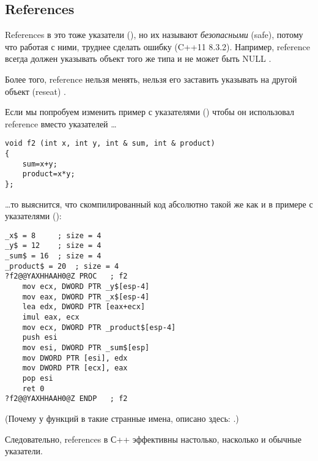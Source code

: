 \subsection{References}
\label{cpp_references}

References в \Cpp это тоже указатели (), но их называют \emph{безопасными} (safe), потому что работая с ними, труднее сделать ошибку (C++11 8.3.2). %
Например, reference всегда должен указывать объект того же типа и не может быть NULL
.

Более того, reference нельзя менять, нельзя его заставить указывать на другой объект (reseat)
.

Если мы попробуем изменить пример с указателями () 
чтобы он использовал reference вместо указателей \dots

\begin{lstlisting}[style=customc]
void f2 (int x, int y, int & sum, int & product)
{
	sum=x+y;
	product=x*y;
};
\end{lstlisting}

\dots то выяснится, что скомпилированный код абсолютно такой 
же как и в примере с указателями ():

\begin{lstlisting}[caption=\Optimizing MSVC 2010,style=customasmx86]
_x$ = 8		; size = 4
_y$ = 12	; size = 4
_sum$ = 16	; size = 4
_product$ = 20	; size = 4
?f2@@YAXHHAAH0@Z PROC	; f2
	mov	ecx, DWORD PTR _y$[esp-4]
	mov	eax, DWORD PTR _x$[esp-4]
	lea	edx, DWORD PTR [eax+ecx]
	imul eax, ecx
	mov ecx, DWORD PTR _product$[esp-4]
	push esi
	mov	esi, DWORD PTR _sum$[esp]
	mov	DWORD PTR [esi], edx
	mov	DWORD PTR [ecx], eax
	pop	esi
	ret	0
?f2@@YAXHHAAH0@Z ENDP	; f2
\end{lstlisting}

(Почему у функций в \Cpp такие странные имена, описано здесь: .)

Следовательно, references в С++ эффективны настолько, насколько и обычные указатели.

